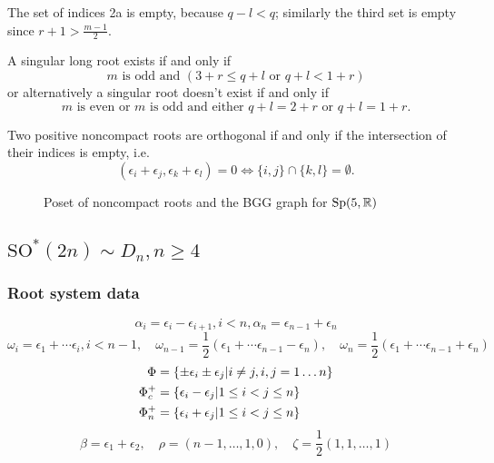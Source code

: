 The set of indices 2a is empty, because $q-l < q$; similarly the third set is empty since $r+1 > \frac{m-1}{2}$.

A singular long root exists if and only if
\[
  m \text{ is odd and } (3+r \leq q+l \text{ or } q+l < 1+r)
\]
or alternatively a singular root doesn't exist if and only if
\[
 m \text{ is even or } m \text{ is odd and either } q+l = 2+r \text{ or } q+l = 1+r.
\]


Two positive noncompact roots are orthogonal if and only if the intersection of their indices is empty, i.e.
\[
 (\epsilon_i + \epsilon_j,\epsilon_k + \epsilon_l) = 0 \Longleftrightarrow \{i,j\} \cap \{k,l\} = \emptyset.
\]


\begin{figure}[H]
  \centering 
  \resizebox{\textwidth}{!}{%
	
	}
  \caption{Poset of noncompact roots and the BGG graph for $\mathrm{Sp}(5,\mathbb{R})$}
\end{figure} 


\clearpage

\subsection[SO*(2n)]{$\mathrm{SO}^*(2n) \sim D_n, n\geq 4$}

\subsubsection{Root system data}

\[\alpha_i = \epsilon_i - \epsilon_{i+1}, i<n, \alpha_n = \epsilon_{n-1} + \epsilon_n\]
\[\omega_i = \epsilon_1+\cdots \epsilon_i, i < n-1, \quad \omega_{n-1} = \frac{1}{2}(\epsilon_1 + \cdots \epsilon_{n-1}-\epsilon_n), \quad \omega_{n} = \frac{1}{2}(\epsilon_1 + \cdots \epsilon_{n-1}+\epsilon_n)\]
\begin{align*}
 \Phi &= \{ \pm \epsilon_i \pm \epsilon_j | i\neq j, i,j = 1\ldots n \} \\
 \Phi_c^+ &= \{ \epsilon_i-\epsilon_j | 1\leq i < j \leq  n\}\\
 \Phi_n^+ &= \{ \epsilon_i + \epsilon_j | 1 \leq i <  j \leq n \}
\end{align*}
\[\beta = \epsilon_1+\epsilon_2,\quad \rho = (n-1,\ldots ,1,0),\quad \zeta = \frac{1}{2}(1,1,\ldots,1)\]

